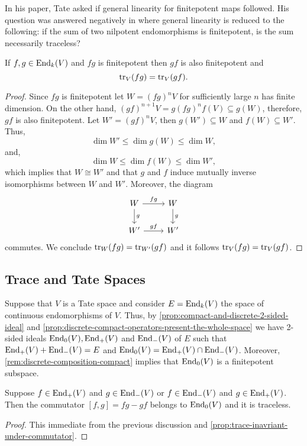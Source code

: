 \begin{remark}\label{rem:general-linearity-trace}
	In his paper, Tate asked if general linearity for finitepotent maps followed. His question was answered negatively in \cite{TATE-TRACE-COUNTER-EXAMPLE} where general linearity is reduced to the following: if the sum of two nilpotent endomorphisms is finitepotent, is the sum necessarily traceless?  
\end{remark}
\begin{proposition}\label{prop:trace-inavriant-under-commutator}
	If $f,g \in \operatorname{End}_{k}(V)$ and $fg$ is finitepotent then $gf$ is also finitepotent and 
	\[
		\operatorname{tr}_{V}(fg) = \operatorname{tr}_{V}(gf).
	\]
\end{proposition}
\begin{proof}
	Since $fg$ is finitepotent let $W =(fg)^{n}V$ for sufficiently large $n$ has finite dimension. On the other hand, $(gf)^{n+1}V= g(fg)^{n}f(V) \subseteq g(W)$, therefore, $gf$ is also finitepotent. Let $W' = (gf)^{n}V$, then $g(W') \subseteq W$ and $f(W) \subseteq W'$. Thus, 
	\[
		\dim W' \leq \dim g(W) \leq \dim W,
	\]
	and, 
	\[
		\dim W \leq \dim f(W) \leq \dim W',
	\]
	which implies that $W\cong W'$ and that $g$ and $f$ induce mutually inverse isomorphisms between $W$ and $W'$. Moreover, the diagram
	\[
		\begin{tikzcd}
			W \arrow[r, "fg"]\arrow[d, "g"] & W \arrow[d, "g"] \\
			W' \arrow[r, "gf"] & W'
		\end{tikzcd}
	\]
	commutes. We conclude $\operatorname{tr}_{W}(fg) = \operatorname{tr}_{W'}(gf)$ and it follows $\operatorname{tr}_{V}(fg) = \operatorname{tr}_{V}(gf)$.
\end{proof}
\subsection*{Trace and Tate Spaces}\label{Tate-and-trace}
Suppose that $V$ is a Tate space and consider $E = \operatorname{End}_{k}(V)$ the space of continuous endomorphisms of $V$. Thus, by \cref{prop:compact-and-discrete-2-sided-ideal} and \cref{prop:discrete-compact-operators-present-the-whole-space} we have 2-sided ideals $\operatorname{End}_{0}(V), \operatorname{End}_{+}(V)$ and $\operatorname{End}_{-}(V)$ of $E$ such that $\operatorname{End}_{+}(V) + \operatorname{End}_{-}(V) = E$ and $\operatorname{End}_{0}(V) = \operatorname{End}_{+}(V) \cap \operatorname{End}_{-}(V)$. Moreover, \cref{rem:discrete-composition-compact} implies that $\operatorname{End}_{0}(V)$ is a finitepotent subspace.
\begin{lemma}\label{lemm:traceless-commutator}
	Suppose $f \in \operatorname{End}_{+}(V)$ and $g \in \operatorname{End}_{-}(V)$ or $f \in \operatorname{End}_{-}(V)$ and $g\in \operatorname{End}_{+}(V)$. Then the commutator $[f,g] = fg - gf$ belongs to $\operatorname{End}_{0}(V)$ and it is traceless.
\end{lemma}
\begin{proof}
	This immediate from the previous discussion and \cref{prop:trace-inavriant-under-commutator}.
\end{proof}

